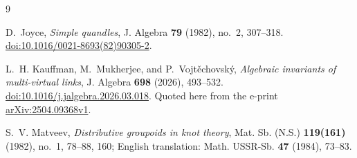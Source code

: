 \documentclass[11pt]{amsart}
\theoremstyle{definition}
\theoremstyle{remark}
\begin{document}
\begin{thebibliography}{9}

D.~Joyce,
\emph{Simple quandles},
J. Algebra \textbf{79} (1982), no.~2, 307--318.
\href{https://doi.org/10.1016/0021-8693(82)90305-2}{doi:10.1016/0021-8693(82)90305-2}.

L.~H. Kauffman, M.~Mukherjee, and P.~Vojt\v{e}chovsk\'y,
\emph{Algebraic invariants of multi-virtual links},
J. Algebra \textbf{698} (2026), 493--532.
\href{https://doi.org/10.1016/j.jalgebra.2026.03.018}{doi:10.1016/j.jalgebra.2026.03.018}.
Quoted here from the e-print
\href{https://arxiv.org/abs/2504.09368v1}{arXiv:2504.09368v1}.

S.~V. Matveev,
\emph{Distributive groupoids in knot theory},
Mat. Sb. (N.S.) \textbf{119(161)} (1982), no.~1, 78--88, 160;
English translation: Math. USSR-Sb. \textbf{47} (1984), 73--83.

\end{thebibliography}
\end{document}
